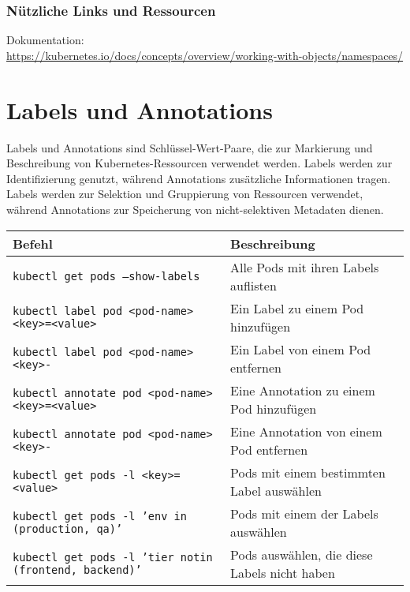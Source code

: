 \subsubsection{Nützliche Links und Ressourcen}
Dokumentation:\\
\url{https://kubernetes.io/docs/concepts/overview/working-with-objects/namespaces/}
\newpage
\section{Labels und Annotations}
Labels und Annotations sind Schlüssel-Wert-Paare, die zur Markierung und Beschreibung von Kubernetes-Ressourcen verwendet werden.
Labels werden zur Identifizierung genutzt, während Annotations zusätzliche Informationen tragen.
Labels werden zur Selektion und Gruppierung von Ressourcen verwendet, während Annotations zur Speicherung von nicht-selektiven Metadaten dienen. \\

\noindent
\begin{tabular}{|l|l|}
\hline
\textbf{Befehl} & \textbf{Beschreibung} \\
\hline
\texttt{kubectl get pods --show-labels} & Alle Pods mit ihren Labels auflisten \\
\texttt{kubectl label pod <pod-name> <key>=<value>} & Ein Label zu einem Pod hinzufügen \\
\texttt{kubectl label pod <pod-name> <key>-} & Ein Label von einem Pod entfernen \\
\texttt{kubectl annotate pod <pod-name> <key>=<value>} & Eine Annotation zu einem Pod hinzufügen \\
\texttt{kubectl annotate pod <pod-name> <key>-} & Eine Annotation von einem Pod entfernen \\
\texttt{kubectl get pods -l <key>=<value>} & Pods mit einem bestimmten Label auswählen \\
\texttt{kubectl get pods -l 'env in (production, qa)'} & Pods mit einem der Labels auswählen\\
\texttt{kubectl get pods -l 'tier notin (frontend, backend)'} & Pods auswählen, die diese Labels nicht haben \\
\hline
\end{tabular}


